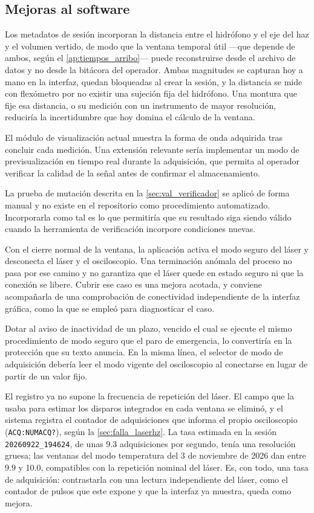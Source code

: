\subsection*{Mejoras al software}

Los metadatos de sesión incorporan la distancia entre el hidrófono y el
eje del haz y el volumen vertido, de modo que la ventana temporal útil
---que depende de ambos, según el \cref{ap:tiempos_arribo}--- puede
reconstruirse desde el archivo de datos y no desde la bitácora del
operador. Ambas magnitudes se capturan hoy a mano en la interfaz, quedan
bloqueadas al crear la sesión, y la
distancia se mide con flexómetro por no existir una sujeción fija del
hidrófono. Una montura que fije esa distancia, o su medición con un
instrumento de mayor resolución, reduciría la incertidumbre que hoy
domina el cálculo de la ventana.

El módulo de visualización actual muestra la forma de onda adquirida
tras concluir cada medición. Una extensión relevante sería implementar
un modo de previsualización en tiempo real durante la adquisición,
que permita al operador verificar la calidad de la señal antes de
confirmar el almacenamiento.

La prueba de mutación descrita en la \cref{sec:val_verificador} se
aplicó de forma manual y no existe en el repositorio como
procedimiento automatizado. Incorporarla como tal es lo que permitiría
que su resultado siga siendo válido cuando la herramienta de
verificación incorpore condiciones nuevas.

Con el cierre normal de la ventana, la aplicación activa el modo seguro
del láser y desconecta el láser y el osciloscopio. Una terminación
anómala del proceso no pasa por ese camino y no garantiza que el láser
quede en estado seguro ni que la conexión se libere. Cubrir ese caso es
una mejora acotada, y conviene acompañarla de una comprobación de
conectividad independiente de la interfaz gráfica, como la que se
empleó para diagnosticar el caso.

Dotar al aviso de inactividad de un plazo, vencido el cual se ejecute
el mismo procedimiento de modo seguro que el paro de emergencia, lo
convertiría en la protección que su texto anuncia. En la
misma línea, el selector de modo de adquisición debería leer el modo
vigente del osciloscopio al conectarse en lugar de partir de un valor
fijo.

El registro ya no supone la frecuencia de repetición del láser. El
campo que la usaba para estimar los disparos integrados en cada ventana
se eliminó, y el sistema registra el contador de adquisiciones que
informa el propio osciloscopio (\texttt{ACQ:NUMACQ?}), según la
\cref{sec:falla_laserhz}. La tasa estimada en la sesión
\texttt{20260922\_194624}, de unas 9.3 adquisiciones por segundo, tenía
una resolución gruesa; las ventanas del modo temperatura del 3 de
noviembre de 2026 dan entre 9.9 y 10.0, compatibles con la repetición
nominal del láser. Es, con todo, una tasa de adquisición: contrastarla
con una lectura independiente del láser, como el contador de pulsos
que este expone y que la interfaz ya muestra, queda como mejora.

